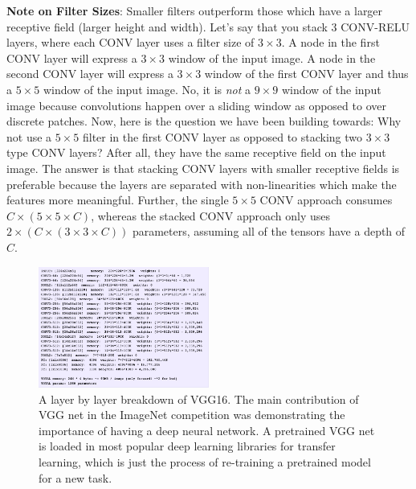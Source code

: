 \documentclass[11pt]{article}
\begin{document}
\textbf{Note on Filter Sizes}: Smaller filters outperform those which have a larger receptive field (larger height and width). Let's say that you stack 3 CONV-RELU layers, where each CONV layer uses a filter size of $3 \times 3$. A node in the first CONV layer will express a $3 \times 3$ window of the input image. A node in the second CONV layer will express a $3 \times 3$ window of the first CONV layer and thus a $5 \times 5$ window of the input image. No, it is \textit{not} a $9 \times 9$ window of the input image because convolutions happen over a sliding window as opposed to over discrete patches. Now, here is the question we have been building towards: Why not use a $5 \times 5$ filter in the first CONV layer as opposed to stacking two $3 \times 3$ type CONV layers? After all, they have the same receptive field on the input image. The answer is that stacking CONV layers with smaller receptive fields is preferable because the layers are separated with non-linearities which make the features more meaningful. Further, the single $5 \times 5$ CONV approach consumes $C \times \left( 5 \times 5 \times C \right)$, whereas the stacked CONV approach only uses $2 \times \left( C \times \left( 3 \times 3 \times C \right) \right)$ parameters, assuming all of the tensors have a depth of $C$.

\begin{figure}
    \begin{center}
        \includegraphics[width=0.5\textwidth]{VGG.png}
        \caption{A layer by layer breakdown of VGG16. The main contribution of VGG net in the ImageNet competition was demonstrating the importance of having a deep neural network. A pretrained VGG net is loaded in most popular deep learning libraries for transfer learning, which is just the process of re-training a pretrained model for a new task.}
        \label{VGG}
    \end{center}
\end{figure}
\end{document}
